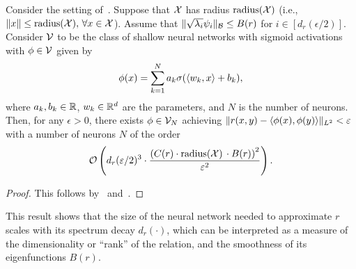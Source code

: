 \begin{corollary}\label{cor:sym_iprod_kernel_barron_neuron_bound}
	Consider the setting of~. Suppose that ${\mathcal{X}}$ has radius $\mathrm{radius}({\mathcal{X}})$ (i.e., $\lVert x\rVert \leq \mathrm{radius}({\mathcal{X}}),\, \forall x \in {\mathcal{X}}$). Assume that $\lVert\sqrt{\lambda_i} \psi_i\rVert_{{\mathcal{B}}} \leq B(r)$ for $i \in [d_r(\epsilon/2)]$. Consider ${\mathcal{V}}$ to be the class of shallow neural networks with sigmoid activations with $\phi \in {\mathcal{V}}$ given by
	\begin{equation*}
		\phi(x) = \sum_{k=1}^{N} a_k \sigma(\iprod{w_k}{x} + b_k),
	\end{equation*}
	where $a_k, b_k \in \mathbb{R}$, $w_k \in \mathbb{R}^{d}$ are the parameters, and $N$ is the number of neurons. Then, for any $\epsilon > 0$, there exists $\phi \in {\mathcal{V}}_N$ achieving $\lVert r(x,y) - \left \langle \phi(x), \phi(y) \right\rangle\rVert_{L^2} < \varepsilon$ with a number of neurons $N$ of the order
	\[{\mathcal{O}}\left(d_r(\varepsilon / 2)^3 \cdot \frac{\left(C(r) \cdot \mathrm{radius}({\mathcal{X}})\, \cdot B(r)\right)^2}{\varepsilon^2}\right).\]
\end{corollary}
\begin{proof}
	This follows by~ and~\textcite{barronUniversalApproximation1993}.
\end{proof}

This result shows that the size of the neural network needed to approximate $r$ scales with its spectrum decay $d_r(\cdot)$, which can be interpreted as a measure of the dimensionality or ``rank'' of the relation, and the smoothness of its eigenfunctions $B(r)$.